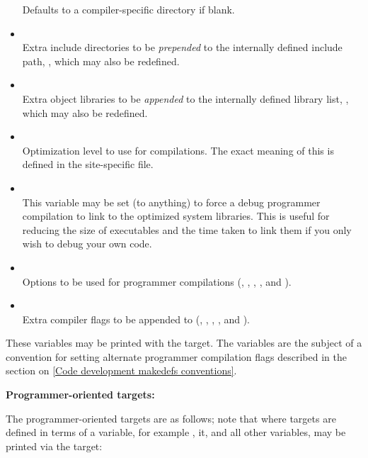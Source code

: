 \begin{itemize}
   Defaults to a compiler-specific directory if blank.

\item
   \\ Extra include directories to be {\em prepended} to the internally
   defined include path, , which may also be redefined.

\item
   \\ Extra object libraries to be {\em appended} to the internally
   defined library list, , which may also be redefined.

\item
   \\ Optimization level to use for compilations.  The exact meaning of this
   is defined in the site-specific  file.

\item
   \\ This variable may be set (to anything) to force a debug programmer
   compilation to link to the optimized system libraries.  This is useful
   for reducing the size of executables and the time taken to link them if
   you only wish to debug your own code.

\item
   \\ Options to be used for programmer compilations (,
   , , ,  and
   ).

\item
   \\ Extra compiler flags to be appended to  (,
   , , ,  and
   ).
\end{itemize}

\noindent
These variables may be printed with the  target.  The
 variables are the subject of a convention for setting alternate
programmer compilation flags described in the section on \ref{Code development
makedefs conventions}.

\textbf{Programmer-oriented targets:}

The programmer-oriented targets are as follows; note that where targets are
defined in terms of a  variable, for example ,
it, and all other variables, may be printed via the  target:

